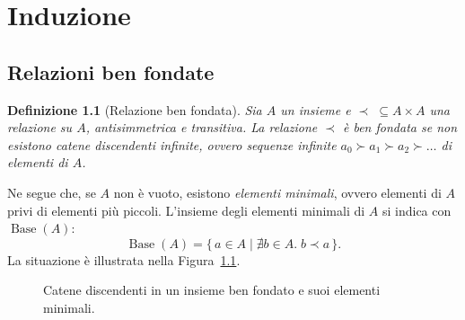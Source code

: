 \documentclass[a4paper, 11pt, oneside]{book}
\theoremstyle{formale}
\newtheorem*{definition}{Definizione}
\begin{document}
    \chapter{Induzione}
    \section{Relazioni ben fondate}
    \begin{definition}[Relazione ben fondata]
        Sia $A$ un insieme e $\prec \; \subseteq A \times A$ una relazione su $A$,
        antisimmetrica e transitiva. La relazione $\prec$ \`e \emph{ben fondata} se non
        esistono \emph{catene discendenti infinite}, ovvero sequenze infinite
        $a_0 \succ a_1 \succ a_2 \succ \dots$ di elementi di $A$.
    \end{definition}

    Ne segue che, se $A$ non \`e vuoto, esistono \emph{elementi minimali}, ovvero elementi
    di $A$ privi di elementi pi\`u piccoli. L'insieme degli elementi minimali di $A$ si
    indica con $\operatorname{Base}(A)$:
    \begin{equation*}
        \operatorname{Base}(A) = \{\, a \in A \mid \nexists b \in A.\; b \prec a \,\}.
    \end{equation*}
    La situazione \`e illustrata nella Figura~\ref{fig:base}.

    \begin{figure}[H]
        \centering
        \caption{Catene discendenti in un insieme ben fondato e suoi elementi minimali.}
        \label{fig:base}
    \end{figure}
\end{document}
